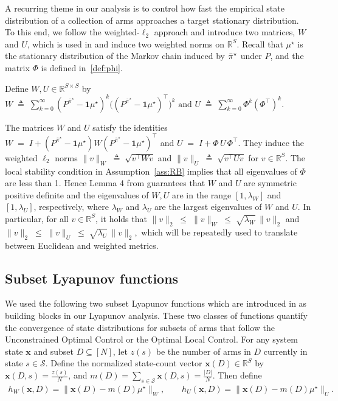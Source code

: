 \documentclass[mnsc,nonblindrev]{informs3}
\newcommand{\one}{\mathbf{1}}
\newcommand{\pibst}{\Bar{\pi}^\star}
\newcommand{\bmx}{\bm{x}}
\begin{document}
\begin{APPENDICES}
A recurring theme in our analysis is to control how fast the empirical state distribution of a collection of arms approaches a target stationary distribution. To this end, we follow the weighted-$\ell_2$ approach and introduce two matrices, $W$ and $U$,
which is used in \citet{hong2024achieving} and induce two weighted norms on $\mathbb{R}^{S}$. 
Recall that $\mu^\star$ is the stationary distribution of the Markov chain induced by $\pibst$ under $P$, and the matrix $\Phi$ is defined in~\eqref{def:phi}.

\begin{definition}
\label{def:WU}
Define $W,U\in\mathbb{R}^{S\times S}$ by
$
    W \;\triangleq\; \sum_{k=0}^{\infty} (P^{\bar\pi^\star}-\one\mu^\star)^k\bigl((P^{\bar\pi^\star}-\one\mu^\star)^{\top}\bigr)^k
    \text{ and }%
    U \;\triangleq\; \sum_{k=0}^{\infty} \Phi^k(\Phi^{\top})^k.
$
\end{definition}
The matrices $W$ and $U$ satisfy the identities
$
    W \;=\; I + (P^{\bar\pi^\star}-\one\mu^\star)W(P^{\bar\pi^\star}-\one\mu^\star)^{\top}
$
and
$
    U \;=\; I + \Phi\,U\,\Phi^{\top}.
$
They induce the weighted $\ell_2$ norms
$
    \|v\|_{W} \;\triangleq\; \sqrt{v^{\top}Wv}
$
and
$
    \|v\|_{U} \;\triangleq\; \sqrt{v^{\top}Uv}
$
for  $v\in\mathbb{R}^{S}.$
The local stability condition in Assumption~\ref{ass:RB} implies that all eigenvalues of $\Phi$ are less than 1. Hence Lemma 4 from \citet{hong2024achieving} guarantees that $W$ and $U$ are symmetric positive definite and the eigenvalues of $W, U$ are in the range $[1,\lambda_W]$ and $ [1,\lambda_U]$, respectively, where $\lambda_W$ and $\lambda_U$ are the largest eigenvalues of $W$ and $U$. 
In particular, for all $v\in\mathbb{R}^{S}$, it holds that
$
\|v\|_2 \;\le\; \|v\|_W \;\le\; \sqrt{\lambda_W}\,\|v\|_2
$
and
$
\|v\|_2 \;\le\; \|v\|_U \;\le\; \sqrt{\lambda_U}\,\|v\|_2,
$
which will be repeatedly used to translate between Euclidean and weighted metrics.


\subsection{Subset Lyapunov functions}
We used the following two subset Lyapunov functions which are introduced in \citet{hong2024achieving} as building blocks in our Lyapunov analysis. These two classes of functions quantify the convergence of state distributions for subsets of arms that follow the Unconstrained Optimal Control or the Optimal Local Control. For any system state $\bmx$ and subset $D\subseteq[N]$, let
$z(s)$ be the number of arms in $D$ currently in state $s\in\mathcal S$.
Define the normalized state-count vector $\bmx(D)\in\mathbb R^{S}$ by
$\bmx(D,s)=\frac{z(s)}{N}$, and $m(D)=\sum_{s\in\mathcal S}\bmx(D,s)=\frac{|D|}{N}$. Then define
\begin{equation}\label{def:hu-hw}
    \begin{aligned}
        h_W(\bmx,D)=\|\bmx(D)-m(D)\mu^\star\|_W,
        \qquad
        h_U(\bmx,D)=\|\bmx(D)-m(D)\mu^\star\|_U.
    \end{aligned}
\end{equation}


\end{APPENDICES}
\end{document}
